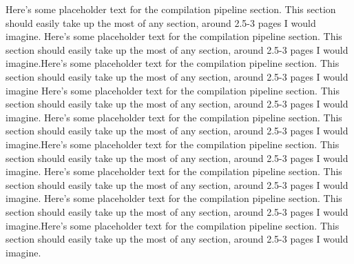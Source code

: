 \documentclass[preprint]{sigplanconf}
\begin{document}
Here's some placeholder text for the compilation pipeline section.  This
section should easily take up the most of any section, around 2.5-3 pages I
would imagine.
Here's some placeholder text for the compilation pipeline section.  This
section should easily take up the most of any section, around 2.5-3 pages I
would imagine.Here's some placeholder text for the compilation pipeline section.
 This
section should easily take up the most of any section, around 2.5-3 pages I
would imagine
Here's some placeholder text for the compilation pipeline section.  This
section should easily take up the most of any section, around 2.5-3 pages I
would imagine.
Here's some placeholder text for the compilation pipeline section.  This
section should easily take up the most of any section, around 2.5-3 pages I
would imagine.Here's some placeholder text for the compilation pipeline section.
 This
section should easily take up the most of any section, around 2.5-3 pages I
would imagine.
Here's some placeholder text for the compilation pipeline section.  This
section should easily take up the most of any section, around 2.5-3 pages I
would imagine.
Here's some placeholder text for the compilation pipeline section.  This
section should easily take up the most of any section, around 2.5-3 pages I
would imagine.Here's some placeholder text for the compilation pipeline section.
 This
section should easily take up the most of any section, around 2.5-3 pages I
would imagine.
\end{document}
